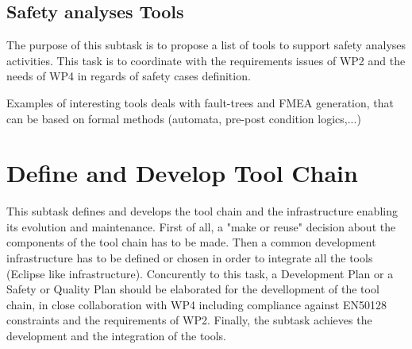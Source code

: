 \documentclass{template/openetcs_article}
\begin{document}
\subsection{Safety analyses Tools}


The purpose of this subtask is to propose a list of tools to  support  safety  analyses activities. This task  is to  coordinate with  the requirements issues of WP2 and the needs of WP4 in regards of safety cases definition.

Examples of interesting tools deals with fault-trees and FMEA generation, that can be based on formal methods (automata, pre-post condition logics,...) 
  
% 
%


\section{Define and Develop Tool Chain}\label{sec:devtoolchain}


This subtask defines and develops the tool chain and the infrastructure enabling
its evolution and maintenance. First of all, a "make or reuse" decision about
the components of the tool chain has to be made. Then a common development
infrastructure has to be defined or chosen in order to integrate all the tools
(Eclipse like infrastructure). 
Concurently to this task, a  Development Plan or a Safety or Quality Plan should
be elaborated for the devellopment of the tool chain, in close collaboration with WP4 
including compliance against EN50128 constraints and the requirements of WP2.
Finally, the subtask achieves the development and the integration of the tools.
\end{document}
